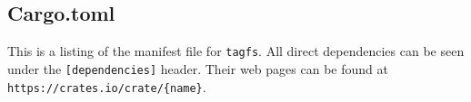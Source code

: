 \documentclass[oneside, author={James Blissett}, degree={BSc},
    title={Development of a Tag Based FUSE Filesystem},
    subtitle={}]{../lib/dissertation}
\begin{document}
\maketitle

\frontmatter




\makedecl

\tableofcontents
\listoffigures
\listoftables





\mainmatter






\backmatter



\begin{appendices}
\chapter{Cargo.toml}
\label{appendix:a}

\noindent
This is a listing of the manifest file for \texttt{tagfs}. All direct
dependencies can be seen under the \texttt{[dependencies]} header. Their
web pages can be found at \texttt{https://crates.io/crate/\{name\}}.


\end{appendices}
\end{document}

